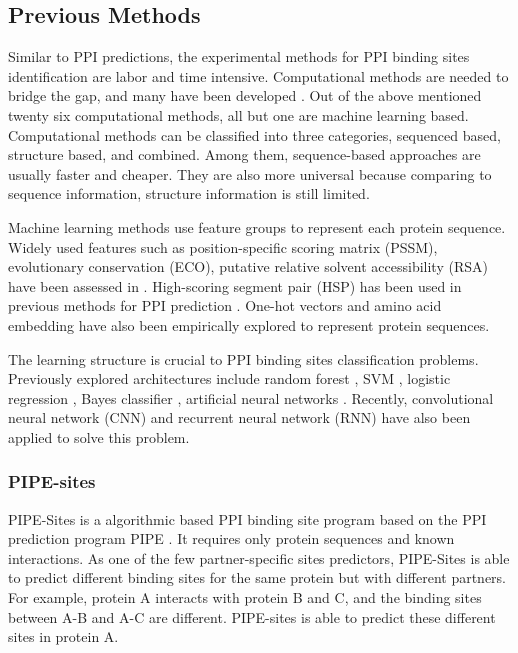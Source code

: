 \subsection{Previous Methods}
Similar to PPI predictions, the experimental methods for PPI binding sites identification are labor and time intensive. Computational methods are needed to bridge the gap, and many have been developed \cite{cao2006enhanced, ofran2007isis, du2009improved, chen2009sequence, london2010structural, chen2010sequence, murakami2010applying, xue2011homppi, amos2011binding, jones2012psicov, asadabadi2013predictions, singh2014springs, wang2014fast, geng2015prediction, laine2015local, hwang2016hybrid, maheshwari2015prediction, liu2016prediction, wei2016protein, maheshwari2016template, jia2016ippbs, zhang2019sequence, wang2019protein, zhang2019scriber, zeng2019protein, xie2020prediction}. Out of the above mentioned twenty six computational methods, all but one are machine learning based. Computational methods can be classified into three categories, sequenced based, structure based, and combined. Among them, sequence-based approaches are usually faster and cheaper. They are also more universal because comparing to sequence information, structure information is still limited. 

Machine learning methods use feature groups to represent each protein sequence. Widely used features such as position-specific scoring matrix (PSSM), evolutionary conservation (ECO), putative relative solvent accessibility (RSA) have been assessed in \cite{zhang2019comprehensive}. High-scoring segment pair (HSP) has been used in previous methods for PPI prediction \cite{li2017sprint}. One-hot vectors \cite{zhang2019sequence, zeng2019protein} and amino acid embedding \cite{asgari2015continuous, heinzinger2019modeling, asgari2019probabilistic} have also been empirically explored to represent protein sequences.

The learning structure is crucial to PPI binding sites classification problems. Previously explored architectures include random forest \cite{wei2016protein, wang2019protein}, SVM \cite{wei2016protein}, logistic regression \cite{zhang2019scriber}, Bayes classifier \cite{murakami2010applying}, artificial neural networks \cite{singh2014springs}. Recently, convolutional neural network (CNN) \cite{zeng2019protein} and recurrent neural network (RNN) \cite{zhang2019sequence} have also been applied to solve this problem. 

\subsubsection{PIPE-sites}
PIPE-Sites \cite{amos2011binding} is a algorithmic based PPI binding site program based on the PPI prediction program PIPE \cite{pitre2006pipe}. It requires only protein sequences and known interactions. As one of the few partner-specific sites predictors, PIPE-Sites is able to predict different binding sites for the same protein but with different partners. For example, protein A interacts with protein B and C, and the binding sites between A-B and A-C are different. PIPE-sites is able to predict these different sites in protein A.

